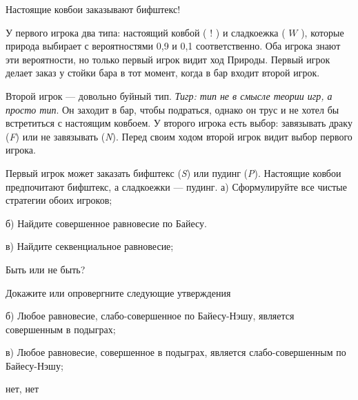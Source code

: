 \begin{problem}
 Настоящие ковбои заказывают бифштекс!\par
{}
У первого игрока два типа: настоящий ковбой ( $!$ ) и сладкоежка ( $W$ ), которые природа выбирает с вероятностями 0,9 и 0,1 соответственно. Оба игрока знают эти вероятности, но только первый игрок видит ход Природы. Первый игрок делает заказ у стойки бара в тот момент, когда в бар входит второй игрок.\par


Второй игрок — довольно буйный тип. {\it Тигр: тип не в смысле теории игр, а просто тип}. Он заходит в бар, чтобы подраться, однако он трус и не хотел бы встретиться с настоящим ковбоем. У второго игрока есть выбор: завязывать драку ({\it F}) или не завязывать ({\it N}). Перед своим ходом второй игрок видит выбор первого игрока.\par
Первый игрок может заказать бифштекс ({\it S}) или пудинг ({\it P}). Настоящие ковбои предпочитают бифштекс, а сладкоежки — пудинг.
а) Сформулируйте все чистые стратегии обоих игроков;\par
б) Найдите совершенное равновесие по Байесу.\par
в) Найдите секвенциальное равновесие;\par



\begin{sol}

\end{sol}
\end{problem}



\begin{problem}
 Быть или не быть?\par
Докажите или опровергните следующие утверждения

б) Любое равновесие, слабо-совершенное по Байесу-Нэшу, является совершенным в подыграх;\par
в) Любое равновесие, совершенное в подыграх, является слабо-совершенным по Байесу-Нэшу;


\begin{sol}
нет, нет
\end{sol}
\end{problem}






